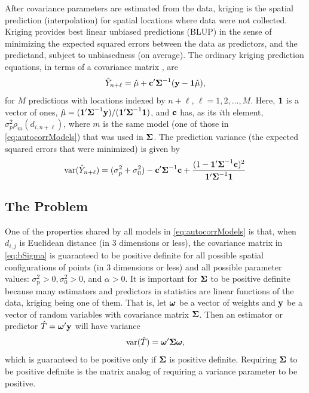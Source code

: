 \documentclass[11pt, titlepage]{article}\usepackage[]{graphicx}\usepackage[]{color}
\begin{document}
\begin{spacing}{1.9}
\begin{flushleft}
After covariance parameters are estimated from the data, kriging is the spatial prediction (interpolation) for spatial locations where data were not collected.  Kriging provides best linear unbiased predictions (BLUP) in the sense of minimizing the expected squared errors between the data as predictors, and the predictand, subject to unbiasedness (on average). The ordinary kriging prediction equations, in terms of a covariance matrix \citep[][p.33]{Scha:Gotw:stat:2005}, are
\begin{equation} \label{eq:OK}
	\hat{Y}_{n+\ell} = \hat{\mu} + \mathbf{c}^{\prime}\mbox{\boldmath $\Sigma$}^{-1}(\mathbf{y} - \mathbf{1}\hat{\mu}), 
\end{equation}
for $M$ predictions with locations indexed by $n+\ell$, $\ell = 1,2,\ldots,M$. Here, $\mathbf{1}$ is a vector of ones, $\hat{\mu} = (\mathbf{1}^{\prime}\mbox{\boldmath $\Sigma$}^{-1}\mathbf{y})/(\mathbf{1}^{\prime}\mbox{\boldmath $\Sigma$}^{-1}\mathbf{1})$, and $\mathbf{c}$ has, as its $i$th element, $\sigma^2_p\rho_m(d_{i,n+\ell})$, where $m$ is the same model (one of those in \ref{eq:autocorrModels}) that was used in $\mbox{\boldmath $\Sigma$}$. The prediction variance (the expected squared errors that were minimized) is given by
\begin{equation} \label{eq:OKse}
	\textrm{var}(\hat{Y}_{n+\ell}) = (\sigma^2_p + \sigma^2_0) - \mathbf{c}^{\prime}\mbox{\boldmath $\Sigma$}^{-1}\mathbf{c} + \frac{(1 - \mathbf{1}^{\prime}\mbox{\boldmath $\Sigma$}^{-1}\mathbf{c})^2}{\mathbf{1}^{\prime}\mbox{\boldmath $\Sigma$}^{-1}\mathbf{1}}
\end{equation}


\subsection*{The Problem}

One of the properties shared by all models in \ref{eq:autocorrModels} is that, when $d_{i,j}$ is Euclidean distance (in 3 dimensions or less), the covariance matrix in \ref{eq:bSigma} is guaranteed to be positive definite for all possible spatial configurations of points (in 3 dimensions or less) and all possible parameter values:  $\sigma^2_\textrm{p} > 0, \sigma^2_0 > 0$, and $\alpha > 0$.  It is important for $\mbox{\boldmath $\Sigma$}$ to be positive definite because many estimators and predictors in statistics are linear functions of the data, kriging being one of them.  That is, let $\mbox{\boldmath $\omega$}$ be a vector of weights and $\mathbf{y}$ be a vector of random variables with covariance matrix $\mbox{\boldmath $\Sigma$}$.  Then an estimator or predictor $\hat{T} = \mbox{\boldmath $\omega$}^{\prime}\mathbf{y}$ will have variance
\begin{equation} \label{eq:quadForm}
  \textrm{var}(\hat{T}) = \mbox{\boldmath $\omega$}^{\prime}\mbox{\boldmath $\Sigma$}\mbox{\boldmath $\omega$},
\end{equation}
which is guaranteed to be positive only if $\mbox{\boldmath $\Sigma$}$ is positive definite.  Requiring $\mbox{\boldmath $\Sigma$}$ to be positive definite is the matrix analog of requiring a variance parameter to be positive.


\end{flushleft}
\end{spacing}
\end{document}
